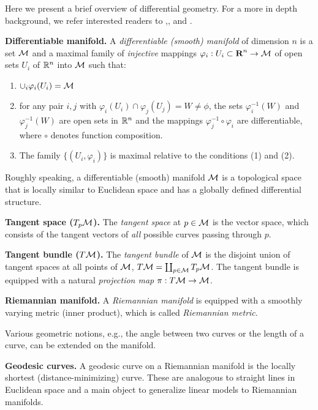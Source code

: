 Here we present a brief overview of differential geometry. For a more in depth background, we refer interested readers to \cite{do1992riemannian},\cite{lee2003smooth}, and \cite{spivak1981comprehensive}.


\textbf{Differentiable manifold.}
A \textit{differentiable (smooth) manifold} of dimension $n$ is a set $\mathcal{M}$ and a maximal family of \textit{injective} mappings $\varphi_{i}:U_{i}
\subset \textbf{R}^{n} \rightarrow \mathcal{M}$ of open sets $U_{i}$ of
$\mathbb{R}^{n}$ into $\mathcal{M}$ such that:
\begin{enumerate}
\item $\cup_{i}\varphi_{i}(U_{i}) =\mathcal{M}$
\item for any pair $i,j$ with $\varphi_{i} (U_{i}) \cap
\varphi_{j} (U_{j}) = W \neq \phi$, the sets $\varphi_{i}^{-1}(W)$
and $\varphi_{j}^{-1}(W)$ are open sets in $\mathbb{R}^{n}$ and the
mappings $\varphi_{j}^{-1} \circ \varphi_{i}$ are
differentiable, where $\circ$ denotes function composition. 
\item The family $\{(U_{i},\varphi_{i})\}$ is maximal relative to
the conditions (1) and (2). 
\end{enumerate}

Roughly speaking, a differentiable (smooth) manifold $\mathcal{M}$ is a topological
space that is locally similar to Euclidean space and has a globally
defined differential structure. 

\textbf{Tangent space ($T_{p}\mathcal{M}$).} The \textit{tangent space} at $p \in \mathcal{M}$ is the vector space, which consists of 
the tangent vectors of {\em all} possible curves passing through $p$. 

\textbf{Tangent bundle ($T\mathcal{M}$).} The \textit{tangent bundle} of $\mathcal{M}$ is the disjoint union of tangent spaces at all points of $\mathcal{M}$, 
$T\mathcal{M} = \coprod_{p \in \mathcal{M}}T_{p}\mathcal{M}$. 
The tangent bundle is equipped with a natural \textit{projection map} $\pi: T\mathcal{M} \rightarrow \mathcal{M}$. 

\textbf{Riemannian manifold.} A \textit{Riemannian manifold} is 
equipped with a
smoothly varying metric (inner product), which is called \textit{Riemannian metric}. 

Various geometric notions, e.g., the angle between two curves or the length of a curve, can be extended on the manifold. \newline 

\textbf{Geodesic curves.} A geodesic curve on a Riemannian manifold is the locally shortest (distance-minimizing) curve.
These are analogous to straight lines in Euclidean space and a main object to generalize linear models to Riemannian manifolds.

